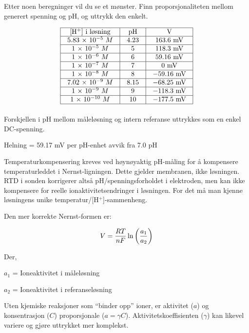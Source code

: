 Etter noen beregninger vil du se et mønster. Finn proporsjonaliteten mellom generert spenning og pH, og uttrykk den enkelt.








$$\vbox{\offinterlineskip
\halign{\strut
\vrule \quad\hfil # \ \hfil & 
\vrule \quad\hfil # \ \hfil & 
\vrule \quad\hfil # \ \hfil \vrule \cr
\noalign{\hrule}
%
[H$^{+}$] i løsning & pH & V \cr
%
\noalign{\hrule}
%
5.83 $\times$ $10^{-5}$ $M$ & 4.23 & 163.6 mV \cr
%
\noalign{\hrule}
%
1 $\times$ $10^{-5}$ $M$ & 5 & 118.3 mV \cr
%
\noalign{\hrule}
%
1 $\times$ $10^{-6}$ $M$ & 6 & 59.16 mV \cr
%
\noalign{\hrule}
%
1 $\times$ $10^{-7}$ $M$ & 7 & 0 mV \cr
%
\noalign{\hrule}
%
1 $\times$ $10^{-8}$ $M$ & 8 & $-59.16$ mV \cr
%
\noalign{\hrule}
%
7.02 $\times$ $10^{-9}$ $M$ & 8.15 & $-68.25$ mV \cr
%
\noalign{\hrule}
%
1 $\times$ $10^{-9}$ $M$ & 9 & $-118.3$ mV \cr
%
\noalign{\hrule}
%
1 $\times$ $10^{-10}$ $M$ & 10 & $-177.5$ mV \cr
%
\noalign{\hrule}
} %
}$$ %

Forskjellen i pH mellom måleløsning og intern referanse uttrykkes som en enkel DC-spenning.

\vskip 10pt

Helning = 59.17 mV per pH-enhet avvik fra 7.0 pH

\vskip 10pt

Temperaturkompensering kreves ved høynøyaktig pH-måling for å kompensere temperaturleddet i Nernst-ligningen. Dette gjelder membranen, ikke løsningen. RTD i sonden korrigerer altså pH/spenningsforholdet i elektroden, men kan ikke kompensere for reelle ionaktivitetsendringer i løsningen. For det må man kjenne løsningens unike temperatur/[H$^{+}$]-sammenheng.

\vskip 10pt

Den mer korrekte Nernst-formen er:

$$V = {{R T} \over {nF}} \ln \left({a_1 \over a_2}\right)$$

\noindent
Der,

$a_1$ = Ioneaktivitet i måleløsning

$a_2$ = Ioneaktivitet i referanseløsning

\vskip 10pt

Uten kjemiske reaksjoner som ``binder opp'' ioner, er aktivitet ($a$) og konsentrasjon ($C$) proporsjonale ($a = \gamma C$). Aktivitetskoeffisienten ($\gamma$) kan likevel variere og gjøre uttrykket mer komplekst.











